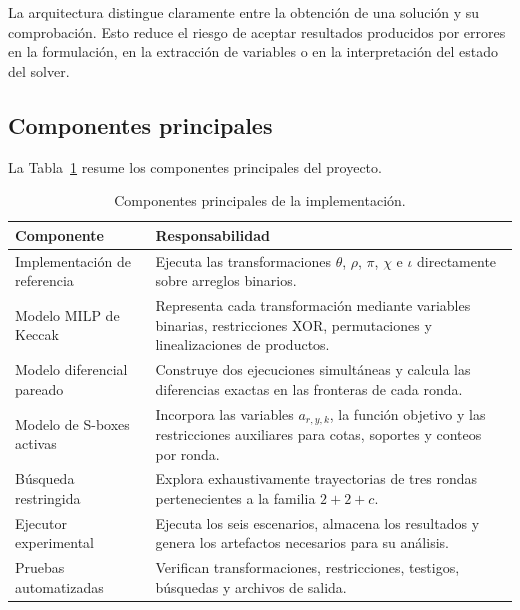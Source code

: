 La arquitectura distingue claramente entre la obtención de una solución
y su comprobación. Esto reduce el riesgo de aceptar resultados producidos
por errores en la formulación, en la extracción de variables o en la
interpretación del estado del solver.


\subsection{Componentes principales}
\label{subsec:componentes_principales}

La Tabla~\ref{tab:componentes_implementacion} resume los componentes
principales del proyecto.

\begin{table}[htbp]
    \centering
    \caption{Componentes principales de la implementación.}
    \label{tab:componentes_implementacion}
    \begin{tabular}{p{}p{}}
        \hline
        \textbf{Componente} & \textbf{Responsabilidad} \\
        \hline

        Implementación de referencia
        &
        Ejecuta las transformaciones $\theta$, $\rho$, $\pi$, $\chi$ e
        $\iota$ directamente sobre arreglos binarios.
        \\[3pt]

        Modelo MILP de Keccak
        &
        Representa cada transformación mediante variables binarias,
        restricciones XOR, permutaciones y linealizaciones de productos.
        \\[3pt]

        Modelo diferencial pareado
        &
        Construye dos ejecuciones simultáneas y calcula las diferencias
        exactas en las fronteras de cada ronda.
        \\[3pt]

        Modelo de S-boxes activas
        &
        Incorpora las variables $a_{r,y,k}$, la función objetivo y las
        restricciones auxiliares para cotas, soportes y conteos por ronda.
        \\[3pt]

        Búsqueda restringida
        &
        Explora exhaustivamente trayectorias de tres rondas pertenecientes
        a la familia $2+2+c$.
        \\[3pt]

        Ejecutor experimental
        &
        Ejecuta los seis escenarios, almacena los resultados y genera los
        artefactos necesarios para su análisis.
        \\[3pt]

        Pruebas automatizadas
        &
        Verifican transformaciones, restricciones, testigos, búsquedas y
        archivos de salida.
        \\
        \hline
    \end{tabular}
\end{table}


